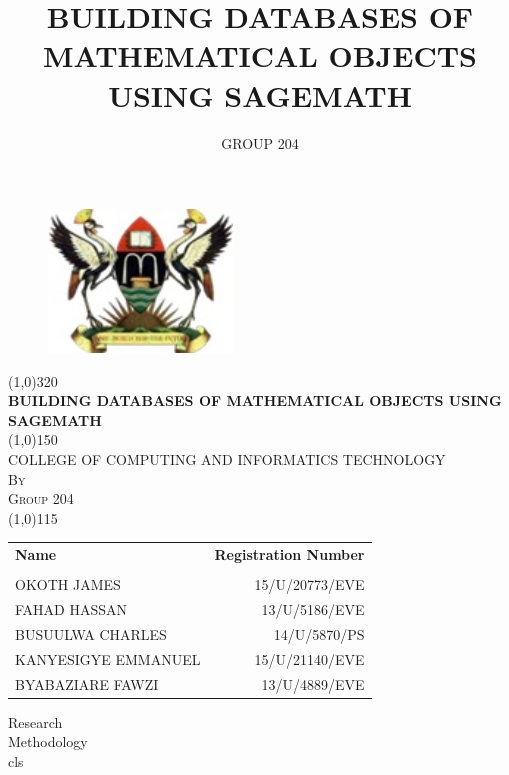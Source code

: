 \documentclass[11pt]{article} %
\title{BUILDING DATABASES OF MATHEMATICAL OBJECTS USING SAGEMATH}
\author{GROUP 204}
\begin{document}
\begin{titlepage}
	\begin{figure}
		\centering
		\includegraphics[height=1.5in]{muk.jpg}
	\end{figure}
	\begin{center}
		\line(1,0){320}\\
		[0.25in]
		\huge{\bfseries BUILDING DATABASES OF MATHEMATICAL OBJECTS USING SAGEMATH}\\
		[2mm]
		\line(1,0){150}\\
		[1.2cm]
		\textsc{\large COLLEGE OF COMPUTING AND INFORMATICS TECHNOLOGY}\\
		[0.5cm]
		\textsc{\large By}\\
		[0.4cm]
		\textsc{\large Group 204}\\
		[0.1cm]
		\line(1,0){115}\\
		[0.2in]
	\end{center}

\begin{table}[H]
	\centering
	\label{Tab:GroupMembers}
	\begin{tabular}{lr}
		\bfseries{Name} & \bfseries{Registration Number} \\ \\ 
		OKOTH JAMES         & 15/U/20773/EVE \\
		FAHAD HASSAN        & 13/U/5186/EVE \\
		BUSUULWA CHARLES    & 14/U/5870/PS \\   
		KANYESIGYE EMMANUEL & 15/U/21140/EVE \\
		BYABAZIARE FAWZI    & 13/U/4889/EVE \\
	\end{tabular}
\end{table}
	\begin{flushright}
		Research\\
		Methodology\\
		cls\\
	\end{flushright}
\end{titlepage}
\thispagestyle{empty}

\end{document}
